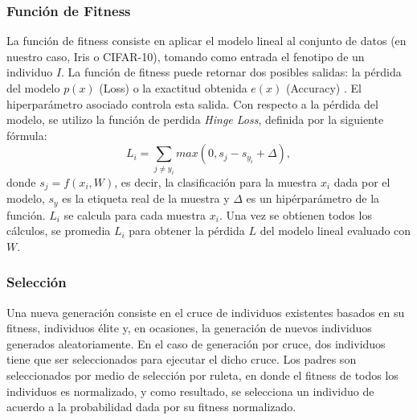 \documentclass[conference]{IEEEtran}
\begin{document}
    \subsubsection{Función de Fitness}
    La función de fitness consiste en aplicar el modelo lineal al conjunto de datos (en nuestro caso, Iris o CIFAR-10), tomando como entrada el fenotipo de un individuo $I$. La función de fitness puede retornar dos posibles salidas: la pérdida del modelo $p(x)$ (Loss) o la exactitud obtenida $e(x)$ (Accuracy) . El hiperparámetro asociado controla esta salida. 
    Con respecto a la pérdida del modelo, se utilizo la función de perdida \textit{Hinge Loss}, definida por la siguiente fórmula:
    \begin{equation}
    	L_i = \sum_{j\neq y_i} max(0, s_j - s_{y_i} + \Delta),
    \end{equation}
    donde  $s_j  = f(x_i,W)$, es decir, la clasificación para la muestra $x_i$ dada por el modelo, $s_y$ es la etiqueta real de la muestra y $\Delta$ es un hipérparámetro de la función. $L_i$ se calcula para cada muestra $x_i$. Una vez se obtienen todos los cálculos, se promedia $L_i$ para obtener la pérdida $L$ del modelo lineal evaluado con $W$.
   	\subsubsection{Selección}
    Una nueva generación consiste en el cruce de individuos existentes basados en su fitness, individuos élite y,  en ocasiones, la generación de nuevos individuos generados aleatoriamente. En el caso de generación por cruce, dos individuos tiene que ser seleccionados para ejecutar el dicho cruce. Los padres son seleccionados por medio de selección por ruleta, en donde el fitness de todos los individuos es normalizado, y como resultado, se selecciona un individuo de acuerdo a la probabilidad dada por su fitness normalizado. 
    
\end{document}
